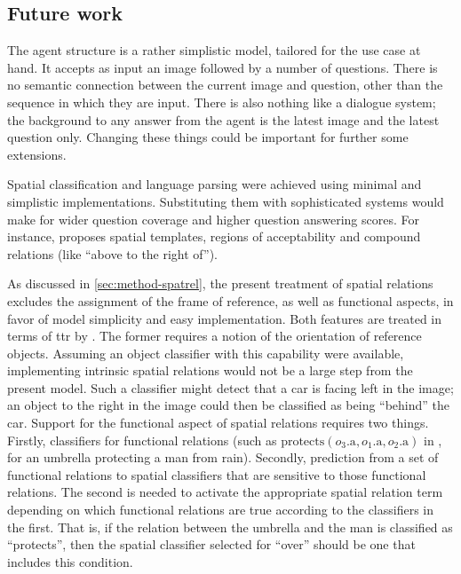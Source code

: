 \subsection{Future work}
\label{sec:futurework}

The agent structure is a rather simplistic model, tailored for the use case at hand.
It accepts as input an image followed by a number of questions.
There is no semantic connection between the current image and question, other than the sequence in which they are input.
There is also nothing like a dialogue system;
the background to any answer from the agent is the latest image and the latest question only.
Changing these things could be important for further some extensions.

Spatial classification and language parsing were achieved using minimal and simplistic implementations.
Substituting them with sophisticated systems would make for wider question coverage and higher question answering scores.
For instance, \cite{LoganComputationalAnalysisApprehension1996} proposes spatial templates, regions of acceptability and compound relations (like ``above to the right of'').

As discussed in \autoref{sec:method-spatrel}, the present treatment of spatial relations excludes the assignment of the frame of reference, as well as functional aspects, in favor of model simplicity and easy implementation.
Both features are treated in terms of \gls{ttr} by \cite{ttrspat}.
The former requires a notion of the orientation of reference objects.
Assuming an object classifier with this capability were available, implementing intrinsic spatial relations would not be a large step from the present model.
Such a classifier might detect that a car is facing left in the image;
an object to the right in the image could then be classified as being ``behind'' the car.
Support for the functional aspect of spatial relations requires two things.
Firstly, classifiers for functional relations (such as $\text{protects}(o_3\text{.a}, o_1\text{.a}, o_2\text{.a})$ in \cite{ttrspat}, for an umbrella protecting a man from rain).
Secondly, prediction from a set of functional relations to spatial classifiers that are sensitive to those functional relations.
The second is needed to activate the appropriate spatial relation term depending on which functional relations are true according to the classifiers in the first.
That is, if the relation between the umbrella and the man is classified as ``protects'', then the spatial classifier selected for ``over'' should be one that includes this condition.

